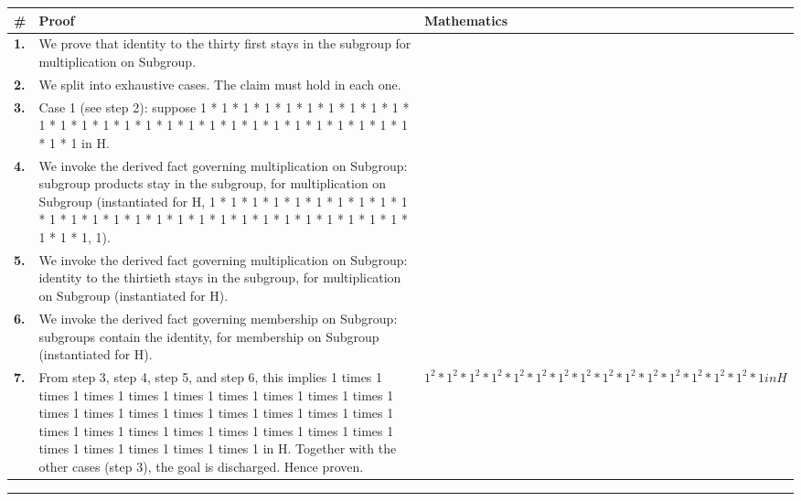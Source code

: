 \documentclass[11pt]{article}
\theoremstyle{definition}
\begin{document}
\begin{tabular}{@{} >{\raggedright\arraybackslash}p{} >{\raggedright\arraybackslash}p{} >{\raggedleft\arraybackslash}p{} @{}}
\textbf{\#} & \textbf{Proof} & \textbf{Mathematics} \\
\midrule
\textbf{1.} & We prove that identity to the thirty first stays in the subgroup for multiplication on Subgroup. & \\[0.45em]
\textbf{2.} & We split into exhaustive cases. The claim must hold in each one. & \\[0.45em]
\textbf{3.} & Case 1 (see step 2): suppose 1 * 1 * 1 * 1 * 1 * 1 * 1 * 1 * 1 * 1 * 1 * 1 * 1 * 1 * 1 * 1 * 1 * 1 * 1 * 1 * 1 * 1 * 1 * 1 * 1 * 1 * 1 * 1 * 1 * 1 in H. & \\[0.45em]
\textbf{4.} & We invoke the derived fact governing multiplication on Subgroup: subgroup products stay in the subgroup, for multiplication on Subgroup (instantiated for H, 1 * 1 * 1 * 1 * 1 * 1 * 1 * 1 * 1 * 1 * 1 * 1 * 1 * 1 * 1 * 1 * 1 * 1 * 1 * 1 * 1 * 1 * 1 * 1 * 1 * 1 * 1 * 1 * 1 * 1, 1). & \\[0.45em]
\textbf{5.} & We invoke the derived fact governing multiplication on Subgroup: identity to the thirtieth stays in the subgroup, for multiplication on Subgroup (instantiated for H). & \\[0.45em]
\textbf{6.} & We invoke the derived fact governing membership on Subgroup: subgroups contain the identity, for membership on Subgroup (instantiated for H). & \\[0.45em]
\textbf{7.} & From step 3, step 4, step 5, and step 6, this implies 1 times 1 times 1 times 1 times 1 times 1 times 1 times 1 times 1 times 1 times 1 times 1 times 1 times 1 times 1 times 1 times 1 times 1 times 1 times 1 times 1 times 1 times 1 times 1 times 1 times 1 times 1 times 1 times 1 times 1 times 1 in H. Together with the other cases (step 3), the goal is discharged. Hence proven. & $\displaystyle 1^{2} * 1^{2} * 1^{2} * 1^{2} * 1^{2} * 1^{2} * 1^{2} * 1^{2} * 1^{2} * 1^{2} * 1^{2} * 1^{2} * 1^{2} * 1^{2} * 1^{2} * 1 in H$ \\[0.45em]
\bottomrule
\end{tabular}
\label{thm:Subgroup-multiplication-identity_to_the_thirty_first_stays_in_the_subgroup}
\par\medskip\hrule
\end{document}
